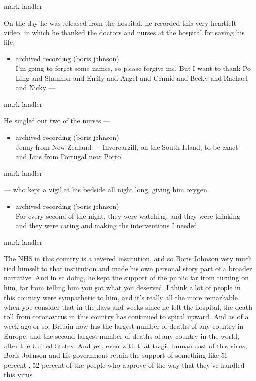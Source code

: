 mark landler

On the day he was released from the hospital, he recorded this very
heartfelt video, in which he thanked the doctors and nurses at the
hospital for saving his life.

\begin{itemize}
\tightlist
\item
  archived recording (boris johnson)\\
  I'm going to forget some names, so please forgive me. But I want to
  thank Po Ling and Shannon and Emily and Angel and Connie and Becky and
  Rachael and Nicky ---
\end{itemize}

mark landler

He singled out two of the nurses ---

\begin{itemize}
\tightlist
\item
  archived recording (boris johnson)\\
  Jenny from New Zealand --- Invercargill, on the South Island, to be
  exact --- and Luis from Portugal near Porto.
\end{itemize}

mark landler

--- who kept a vigil at his bedside all night long, giving him oxygen.

\begin{itemize}
\tightlist
\item
  archived recording (boris johnson)\\
  For every second of the night, they were watching, and they were
  thinking and they were caring and making the interventions I needed.
\end{itemize}

mark landler

The NHS in this country is a revered institution, and so Boris Johnson
very much tied himself to that institution and made his own personal
story part of a broader narrative. And in so doing, he kept the support
of the public far from turning on him, far from telling him you got what
you deserved. I think a lot of people in this country were sympathetic
to him, and it's really all the more remarkable when you consider that
in the days and weeks since he left the hospital, the death toll from
coronavirus in this country has continued to spiral upward. And as of a
week ago or so, Britain now has the largest number of deaths of any
country in Europe, and the second largest number of deaths of any
country in the world, after the United States. And yet, even with that
tragic human cost of this virus, Boris Johnson and his government retain
the support of something like 51 percent , 52 percent of the people who
approve of the way that they've handled this virus.

